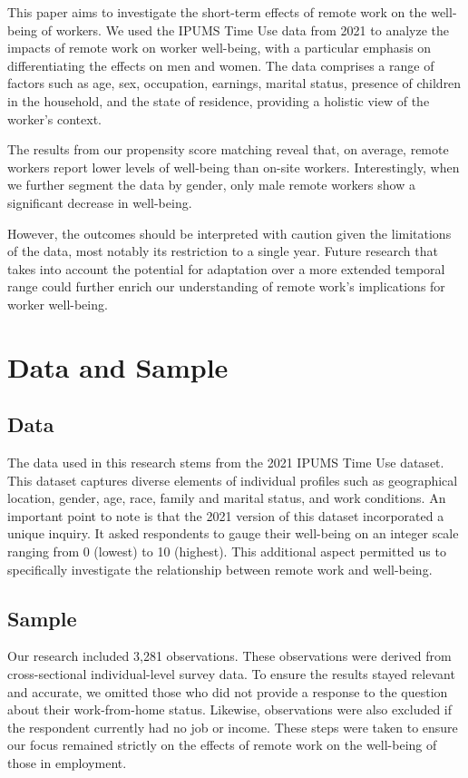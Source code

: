 \documentclass[12pt]{article}
\begin{document}
This paper aims to investigate the short-term effects of remote work on the well-being of workers. We used the IPUMS Time Use data from 2021 to analyze the impacts of remote work on worker well-being, with a particular emphasis on differentiating the effects on men and women. The data comprises a range of factors such as age, sex, occupation, earnings, marital status, presence of children in the household, and the state of residence, providing a holistic view of the worker's context.

The results from our propensity score matching reveal that, on average, remote workers report lower levels of well-being than on-site workers. Interestingly, when we further segment the data by gender, only male remote workers show a significant decrease in well-being.

However, the outcomes should be interpreted with caution given the limitations of the data, most notably its restriction to a single year. Future research that takes into account the potential for adaptation over a more extended temporal range could further enrich our understanding of remote work's implications for worker well-being.

\section{Data and Sample}\label{data}

\subsection{Data}
The data used in this research stems from the 2021 IPUMS Time Use dataset. This dataset captures diverse elements of individual profiles such as geographical location, gender, age, race, family and marital status, and work conditions. An important point to note is that the 2021 version of this dataset incorporated a unique inquiry. It asked respondents to gauge their well-being on an integer scale ranging from 0 (lowest) to 10 (highest). This additional aspect permitted us to specifically investigate the relationship between remote work and well-being.

\subsection{Sample}
Our research included 3,281 observations. These observations were derived from cross-sectional individual-level survey data. To ensure the results stayed relevant and accurate, we omitted those who did not provide a response to the question about their work-from-home status. Likewise, observations were also excluded if the respondent currently had no job or income. These steps were taken to ensure our focus remained strictly on the effects of remote work on the well-being of those in employment.
\end{document}
